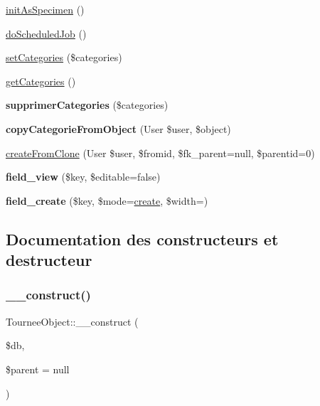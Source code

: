 \begin{DoxyCompactItemize}
\hyperlink{classTourneeObject_a57c9b21299fbc8f8ead42fdc48da105b}{init\+As\+Specimen} ()
\item 
\hyperlink{classTourneeObject_a7d1b14c0a0716433c556867ffd3e0494}{do\+Scheduled\+Job} ()
\item 
\hyperlink{classTourneeObject_ac12b04b14ae684119d7701e52382b5a8}{set\+Categories} (\$categories)
\item 
\hyperlink{classTourneeObject_a932240236e5582fbfbe3672320f58d0f}{get\+Categories} ()
\item 
\mbox{\label{classTourneeObject_adf457290caae2e22905d43edcf95b9fc}} 
{\bfseries supprimer\+Categories} (\$categories)
\item 
\mbox{\label{classTourneeObject_a526064f892779bb9651300ac9fb6435f}} 
{\bfseries copy\+Categorie\+From\+Object} (User \$user, \$object)
\item 
\hyperlink{classTourneeObject_aa4e5b605ee9f763520b6e052568e9b4a}{create\+From\+Clone} (User \$user, \$fromid, \$fk\+\_\+parent=null, \$parentid=0)
\item 
\mbox{\label{classTourneeObject_ac0a8139009a5cd78e4a64154e05797e1}} 
{\bfseries field\+\_\+view} (\$key, \$editable=false)
\item 
\mbox{\label{classTourneeObject_af73f8e582beb2e8a227aee1faee27852}} 
{\bfseries field\+\_\+create} (\$key, \$mode=\textquotesingle{}\hyperlink{classTourneeObject_a9b71233f3654dbf3ed935ecbef106e4a}{create}\textquotesingle{}, \$width=\textquotesingle{}\textquotesingle{})
\end{DoxyCompactItemize}


\subsection{Documentation des constructeurs et destructeur}
\mbox{\label{classTourneeObject_ab9d8bb7b8b6e5ddbdad0686ec58f2cff}} 
\subsubsection{\texorpdfstring{\+\_\+\+\_\+construct()}{\_\_construct()}}
{\footnotesize\ttfamily Tournee\+Object\+::\+\_\+\+\_\+construct (\begin{DoxyParamCaption}\item[{Doli\+DB}]{\$db,  }\item[{}]{\$parent = {\ttfamily null} }\end{DoxyParamCaption})}

